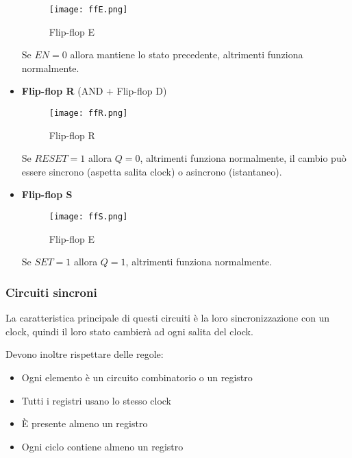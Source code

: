 \documentclass{article}
\begin{document}
\begin{itemize}
    \begin{figure}[ht]
        \centering
        \texttt{[image: ffE.png]}
        \caption{Flip-flop E}
        \label{fig:ff_E}
    \end{figure}

    Se $EN = 0$ allora mantiene lo stato precedente, altrimenti funziona normalmente.

    \vspace{5pt}

    \item \textbf{Flip-flop R} (AND + Flip-flop D)

    \begin{figure}[ht]
        \centering
        \texttt{[image: ffR.png]}
        \caption{Flip-flop R}
        \label{fig:ff_R}
    \end{figure}

    Se $RESET = 1$ allora $Q=0$, altrimenti funziona normalmente, il cambio può essere sincrono (aspetta salita clock) o asincrono (istantaneo).

    \newpage

    \item \textbf{Flip-flop S }

    \begin{figure}[ht]
        \centering
        \texttt{[image: ffS.png]}
        \caption{Flip-flop E}
        \label{fig:ff_S}
    \end{figure}

    Se $SET = 1$ allora $Q=1$, altrimenti funziona normalmente.
    
\end{itemize}

\subsubsection{Circuiti sincroni}

La caratteristica principale di questi circuiti è la loro sincronizzazione con un clock, quindi il loro stato cambierà ad ogni salita del clock.\newline

Devono inoltre rispettare delle regole:
\begin{itemize}
    \item Ogni elemento è un circuito combinatorio o un registro
    \item Tutti i registri usano lo stesso clock 
    \item È presente almeno un registro
    \item Ogni ciclo contiene almeno un registro
\end{itemize}
\end{document}
